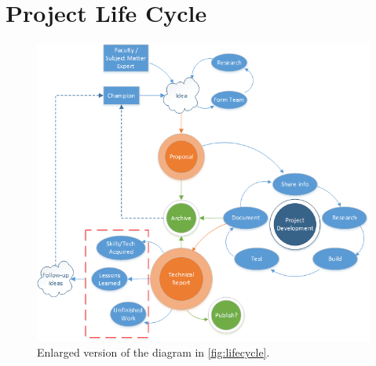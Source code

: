 \documentclass[conference]{IEEEtran} %
\begin{document}
\onecolumn
\appendices{}
\section{Project Life Cycle}
\begin{figure}[h]
  \centering
  \includegraphics[]{figs/project-life-cycle.png}
  \caption{Enlarged version of the diagram in \autoref{fig:lifecycle}.}
\end{figure}
\end{document}

